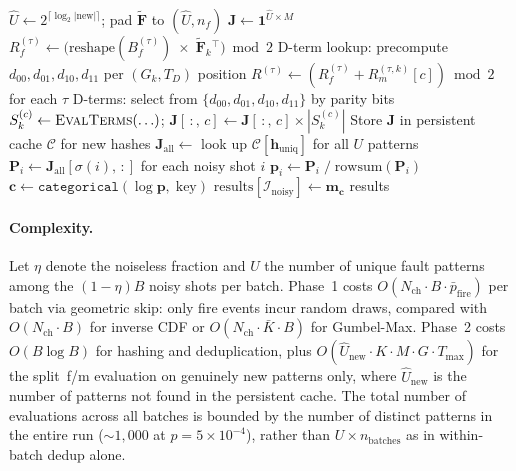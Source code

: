 \documentclass[a4paper,onecolumn,11pt,accepted=2026-06-10]{quantumarticle}
\begin{document}
\begin{algorithm}[H]
\begin{algorithmic}[1]
    \State $\hat{U} \gets 2^{\lceil\log_2 |\mathrm{new}|\rceil}$;\quad
        pad $\tilde{\mathbf{F}}$ to $(\hat{U}, n_f)$
    \Statex
    \Statex {}
    \State $\mathbf{J} \gets \mathbf{1}^{\hat{U} \times M}$
            \State $R_f^{(\tau)} \gets \bigl(\mathrm{reshape}(B_f^{(\tau)}) \;\times\; \tilde{\mathbf{F}}_k{}^\top\bigr) \bmod 2$
        \EndFor
        \State D-term lookup: precompute $d_{00}, d_{01}, d_{10}, d_{11}$ per $(G_k, T_D)$ position
        \Statex {}
            \State $R^{(\tau)} \gets (R_f^{(\tau)} + R_m^{(\tau,k)}[c]) \bmod 2$ for each $\tau$
            \State D-terms: select from $\{d_{00}, d_{01}, d_{10}, d_{11}\}$ by parity bits
            \State $S_k^{(c)} \gets \textsc{EvalTerms}(\ldots)$;\quad
                $\mathbf{J}[\,:,\, c] \gets \mathbf{J}[\,:,\, c] \times |S_k^{(c)}|$
        \EndFor
    \EndFor
    \State Store $\mathbf{J}$ in persistent cache $\mathcal{C}$ for new hashes
    \Statex
    \Statex {}
    \State $\mathbf{J}_{\mathrm{all}} \gets$ look up $\mathcal{C}[\mathbf{h}_{\mathrm{uniq}}]$ for all $U$ patterns
    \State $\mathbf{P}_i \gets \mathbf{J}_{\mathrm{all}}[\sigma(i),\, :]$ for each noisy shot $i$
    \State $\mathbf{p}_i \gets \mathbf{P}_i \;/\; \mathrm{rowsum}(\mathbf{P}_i)$
    \State $\mathbf{c} \gets \texttt{categorical}(\log \mathbf{p},\; \mathrm{key})$
    \State $\mathrm{results}[\mathcal{I}_{\mathrm{noisy}}] \gets \mathbf{m}_{\mathbf{c}}$
    \Statex
    \State \Return results
\EndFunction
\end{algorithmic}
\end{algorithm}

\paragraph{Complexity.}
Let $\eta$ denote the noiseless fraction and $U$ the number of unique fault patterns among the $(1{-}\eta)B$ noisy shots per batch. Phase~1 costs $O(N_{\mathrm{ch}} \cdot B \cdot \bar{p}_{\mathrm{fire}})$ per batch via geometric skip: only fire events incur random draws, compared with $O(N_{\mathrm{ch}} \cdot B)$ for inverse CDF or $O(N_{\mathrm{ch}} \cdot \bar{K} \cdot B)$ for Gumbel-Max. Phase~2 costs $O(B \log B)$ for hashing and deduplication, plus $O(\hat{U}_{\mathrm{new}} \cdot K \cdot M \cdot G \cdot T_{\max})$ for the split~f/m evaluation on genuinely new patterns only, where $\hat{U}_{\mathrm{new}}$ is the number of patterns not found in the persistent cache. The total number of evaluations across all batches is bounded by the number of distinct patterns in the entire run (${\sim}1{,}000$ at $p = 5 \times 10^{-4}$), rather than $U \times n_{\mathrm{batches}}$ as in within-batch dedup alone.
\end{document}
